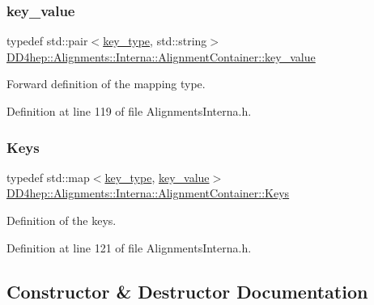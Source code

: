 \subsubsection{\texorpdfstring{key\+\_\+value}{key\_value}}
{\footnotesize\ttfamily typedef std\+::pair$<$\hyperlink{class_d_d4hep_1_1_alignments_1_1_interna_1_1_alignment_container_a7395f0e25d9e524d2a2bd7df0f4364e6}{key\+\_\+type}, std\+::string$>$ \hyperlink{class_d_d4hep_1_1_alignments_1_1_interna_1_1_alignment_container_a64a96ad5b67f6e67b12fd3aaaa8bbcb8}{D\+D4hep\+::\+Alignments\+::\+Interna\+::\+Alignment\+Container\+::key\+\_\+value}}



Forward definition of the mapping type. 



Definition at line 119 of file Alignments\+Interna.\+h.

\hypertarget{class_d_d4hep_1_1_alignments_1_1_interna_1_1_alignment_container_a3fc62784c22ba44d9ac63c424ec55799}{}\label{class_d_d4hep_1_1_alignments_1_1_interna_1_1_alignment_container_a3fc62784c22ba44d9ac63c424ec55799} 
\subsubsection{\texorpdfstring{Keys}{Keys}}
{\footnotesize\ttfamily typedef std\+::map$<$\hyperlink{class_d_d4hep_1_1_alignments_1_1_interna_1_1_alignment_container_a7395f0e25d9e524d2a2bd7df0f4364e6}{key\+\_\+type}, \hyperlink{class_d_d4hep_1_1_alignments_1_1_interna_1_1_alignment_container_a64a96ad5b67f6e67b12fd3aaaa8bbcb8}{key\+\_\+value}$>$ \hyperlink{class_d_d4hep_1_1_alignments_1_1_interna_1_1_alignment_container_a3fc62784c22ba44d9ac63c424ec55799}{D\+D4hep\+::\+Alignments\+::\+Interna\+::\+Alignment\+Container\+::\+Keys}}



Definition of the keys. 



Definition at line 121 of file Alignments\+Interna.\+h.



\subsection{Constructor \& Destructor Documentation}
\hypertarget{class_d_d4hep_1_1_alignments_1_1_interna_1_1_alignment_container_a360f49ea724e7c446c8b81adfbac8c85}{}\label{class_d_d4hep_1_1_alignments_1_1_interna_1_1_alignment_container_a360f49ea724e7c446c8b81adfbac8c85} 
